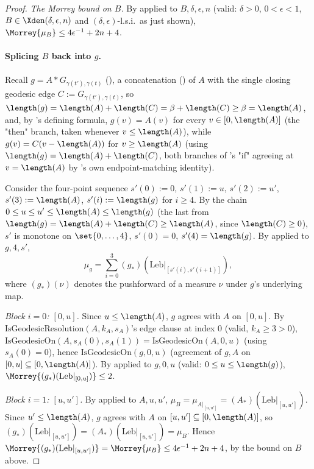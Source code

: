 \begin{proof}
  \emph{The Morrey bound on $B$.} By  applied to $B,\delta,\epsilon,n$ (valid:
  $\delta>0$, $0<\epsilon<1$, $B\in\Xden(\delta,\epsilon,n)$ and $(\delta,\epsilon)$-l.s.i.\ as just
  shown), $\Morrey{\mu_B} \le 4\epsilon^{-1}+2n+4$.

  \paragraph{Splicing $B$ back into $g$.} Recall $g = A * G_{\gamma(t'),\gamma(t)}$
  (), a concatenation () of $A$ with the single closing
  geodesic edge $C := G_{\gamma(t'),\gamma(t)}$, so $\length(g) = \length(A)+\length(C) = \beta +
  \length(C) \ge \beta = \length(A)$, and, by 's defining formula, $g(v) =
  A(v)$ for every $v\in[0,\length(A)]$ (the "then" branch, taken whenever $v\le\length(A)$), while
  $g(v) = C(v-\length(A))$ for $v\ge\length(A)$ (using $\length(g)=\length(A)+\length(C)$, both
  branches of 's "if" agreeing at $v=\length(A)$ by 's own
  endpoint-matching identity).

  Consider the four-point sequence $s'(0):=0$, $s'(1):=u$, $s'(2):=u'$, $s'(3):=\length(A)$,
  $s'(i):=\length(g)$ for $i\ge4$. By the chain $0\le u\le u'\le\length(A)\le\length(g)$ (the last
  from $\length(g)=\length(A)+\length(C)\ge\length(A)$, since $\length(C)\ge0$), $s'$ is monotone on
  $\set{0,\dots,4}$, $s'(0)=0$, $s'(4)=\length(g)$. By  applied to
  $g,4,s'$,
  \[
    \mu_g = \sum_{i=0}^{3} (g_*)(\mathrm{Leb}|_{[s'(i),s'(i+1)]})
    ,
  \]
  where $(g_*)(\nu)$ denotes the pushforward of a measure $\nu$ under $g$'s underlying map.

  \emph{Block $i=0$: $[0,u]$.} Since $u\le\length(A)$, $g$ agrees with $A$ on $[0,u]$. By
  $\mathrm{IsGeodesicResolution}(A,k_A,s_A)$'s edge clause at index $0$ (valid, $k_A\ge3>0$),
  $\mathrm{IsGeodesicOn}(A,s_A(0),s_A(1)) = \mathrm{IsGeodesicOn}(A,0,u)$ (using $s_A(0)=0$), hence
  $\mathrm{IsGeodesicOn}(g,0,u)$ (agreement of $g,A$ on $[0,u]\subseteq[0,\length(A)]$). By
   applied to $g,0,u$ (valid: $0\le u\le\length(g)$),
  $\Morrey{(g_*)(\mathrm{Leb}|_{[0,u]})} \le 2$.

  \emph{Block $i=1$: $[u,u']$.} By  applied to $A,u,u'$,
  $\mu_B = \mu_{A|_{[u,u']}} = (A_*)(\mathrm{Leb}|_{[u,u']})$. Since $u'\le\length(A)$, $g$ agrees
  with $A$ on $[u,u']\subseteq[0,\length(A)]$, so $(g_*)(\mathrm{Leb}|_{[u,u']}) =
  (A_*)(\mathrm{Leb}|_{[u,u']}) = \mu_B$. Hence $\Morrey{(g_*)(\mathrm{Leb}|_{[u,u']})} =
  \Morrey{\mu_B} \le 4\epsilon^{-1}+2n+4$, by the bound on $B$ above.


\end{proof}
